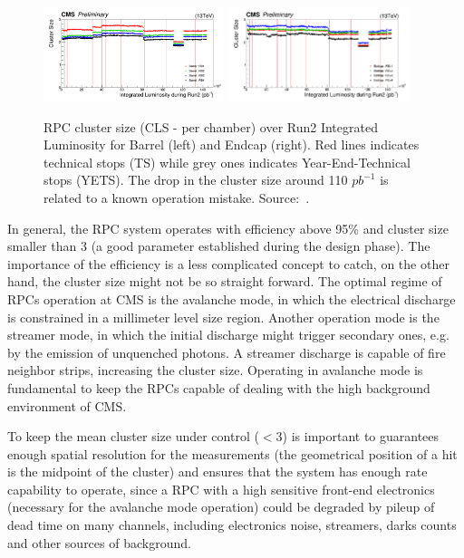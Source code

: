 \begin{figure}[htbp]
    \centering
    \includegraphics[width=0.47\textwidth,keepaspectratio]{figures/rpc/performance/barrel_cls_vs_intL.png}
    \includegraphics[width=0.47\textwidth,keepaspectratio]{figures/rpc/performance/endcap_cls_vs_intL.png}
    \caption{RPC cluster size (CLS - per chamber) over Run2 Integrated Luminosity for Barrel (left) and Endcap (right). Red lines indicates technical stops (TS) while grey ones indicates Year-End-Technical stops (YETS). The drop in the cluster size around 110 $pb^{-1}$ is related to a known operation mistake. Source:~\cite{rpc_run2_performance}.}
    \label{cls_run2}
\end{figure}

In general, the RPC system operates with efficiency above 95\% and cluster size smaller than 3 (a good parameter established during the design phase). The importance of the efficiency is a less complicated concept to catch, on the other hand, the cluster size might not be so straight forward. The optimal regime of RPCs operation at CMS is the avalanche mode, in which the electrical discharge is constrained in a millimeter level size region. Another operation mode is the streamer mode, in which the initial discharge might trigger secondary ones, e.g. by the emission of unquenched photons. A streamer discharge is capable of fire neighbor strips, increasing the cluster size. Operating in avalanche mode is fundamental to keep the RPCs capable of dealing with the high background environment of CMS. 

To keep the mean cluster size under control ($< 3$) is important to guarantees enough spatial resolution for the measurements (the geometrical position of a hit is the midpoint of the cluster) and ensures that the system has enough rate capability to operate, since a RPC with a high sensitive front-end electronics (necessary for the avalanche mode operation) could be degraded by pileup of dead time on many channels, including electronics noise, streamers, darks counts and other sources of background.


